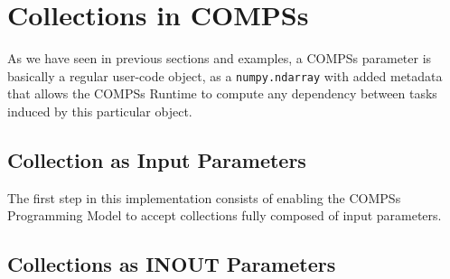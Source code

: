 \section{Collections in COMPSs}
\label{sec:col}
As we have seen in previous sections and examples, a COMPSs parameter is basically a regular user-code object, as a \verb|numpy.ndarray| with added metadata that allows the COMPSs Runtime to compute any dependency between tasks induced by this particular object.

\subsection{Collection as Input Parameters}
\label{subsec:col_in}
The first step in this implementation consists of enabling the COMPSs Programming Model to accept collections fully composed of input parameters.

\subsection{Collections as INOUT Parameters}
\label{subsec:col_inout}
